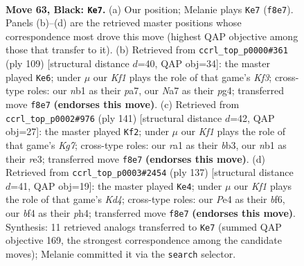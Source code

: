 \documentclass[11pt]{article}
\begin{document}
\clearpage

\begin{figure}[p]\centering
\begin{subfigure}{0.46\textwidth}\centering
\resizebox{\linewidth}{!}{%
\newchessgame
\chessboard[
  setfen={5k1K/n1P5/p7/P4p1p/4pBb1/6P1/8/RN1r4 b - - 33 63},
  showmover=false,
  pgfstyle=straightmove, color=movearrow, markmove={f8-e7}
]}
\caption{}
\end{subfigure}\hfill
\begin{subfigure}{0.46\textwidth}\centering
\resizebox{\linewidth}{!}{%
\newchessgame
\chessboard[
  setfen={r7/P2p4/2bP1k2/4p1p1/6Pp/3KB2P/R7/8 b - - 1 55},
  showmover=false,
  pgfstyle=straightmove, color=movearrow, markmove={f6-e6}
]}
\caption{}
\end{subfigure}
\\[4pt]
\begin{subfigure}{0.46\textwidth}\centering
\resizebox{\linewidth}{!}{%
\newchessgame
\chessboard[
  setfen={8/2p5/1p6/pP6/Pb1PK3/1B2R3/6k1/4r3 b - - 17 71},
  showmover=false,
  pgfstyle=straightmove, color=movearrow, markmove={g2-f2}
]}
\caption{}
\end{subfigure}\hfill
\begin{subfigure}{0.46\textwidth}\centering
\resizebox{\linewidth}{!}{%
\newchessgame
\chessboard[
  setfen={8/8/5B2/3k1p1p/6bP/PR4P1/r7/5K2 b - - 5 69},
  showmover=false,
  pgfstyle=straightmove, color=movearrow, markmove={d5-e4}
]}
\caption{}
\end{subfigure}
\caption{\textbf{Move 63, Black: \texttt{Ke7}.} (a) Our position; Melanie plays \texttt{Ke7} (\texttt{f8e7}). Panels (b)--(d) are the retrieved master positions whose correspondence most drove this move (highest QAP objective among those that transfer to it). (b) Retrieved from \texttt{ccrl\_top\_p0000\#361} (ply 109) [structural distance $d$=40, QAP obj=34]: the master played \texttt{Ke6}; under $\mu$ our \emph{Kf1} plays the role of that game's \emph{Kf3}; cross-type roles: our \emph{n}b1 as their \emph{p}a7, our \emph{N}a7 as their \emph{p}g4; transferred move \texttt{f8e7} \textbf{(endorses this move)}. (c) Retrieved from \texttt{ccrl\_top\_p0002\#976} (ply 141) [structural distance $d$=42, QAP obj=27]: the master played \texttt{Kf2}; under $\mu$ our \emph{Kf1} plays the role of that game's \emph{Kg7}; cross-type roles: our \emph{r}a1 as their \emph{b}b3, our \emph{n}b1 as their \emph{r}e3; transferred move \texttt{f8e7} \textbf{(endorses this move)}. (d) Retrieved from \texttt{ccrl\_top\_p0003\#2454} (ply 137) [structural distance $d$=41, QAP obj=19]: the master played \texttt{Ke4}; under $\mu$ our \emph{Kf1} plays the role of that game's \emph{Kd4}; cross-type roles: our \emph{P}e4 as their \emph{b}f6, our \emph{b}f4 as their \emph{p}h4; transferred move \texttt{f8e7} \textbf{(endorses this move)}. Synthesis: 11 retrieved analogs transferred to \texttt{Ke7} (summed QAP objective 169, the strongest correspondence among the candidate moves); Melanie committed it via the \texttt{search} selector.}
\label{fig:thought-m125}
\end{figure}
\end{document}
